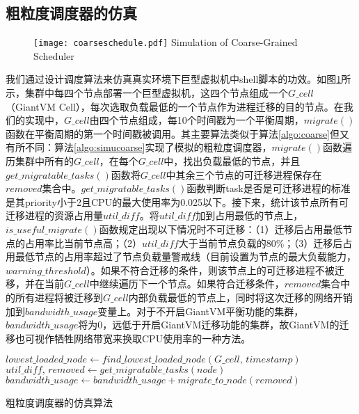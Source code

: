 \subsection{粗粒度调度器的仿真}
\begin{figure}[!htp]
  \centering
  \texttt{[image: coarseschedule.pdf]}
    {Simulation of Coarse-Grained Scheduler}
  \label{fig:simucoarse}
\end{figure}
我们通过设计调度算法来仿真真实环境下巨型虚拟机中shell脚本的功效。如图\ref{fig:simucoarse}所示，集群中每四个节点部署一个巨型虚拟机，这四个节点组成一个$G\_cell$（GiantVM Cell），每次选取负载最低的一个节点作为进程迁移的目的节点。在我们的实现中，$G\_cell$由四个节点组成，每10个时间戳为一个平衡周期，$migrate()$函数在平衡周期的第一个时间戳被调用。其主要算法类似于算法\ref{algo:coarse}但又有所不同：算法\ref{algo:simucoarse}实现了模拟的粗粒度调度器，$migrate()$函数遍历集群中所有的$G\_cell$，在每个$G\_cell$中，找出负载最低的节点，并且$get\_migratable\_tasks()$函数将$G\_cell$中其余三个节点的可迁移进程保存在$removed$集合中。$get\_migratable\_tasks()$函数判断task是否是可迁移进程的标准是其priority小于2且CPU的最大使用率为0.025以下。接下来，统计该节点所有可迁移进程的资源占用量$util\_diff$。将$util\_diff$加到占用最低的节点上，$is\_useful\_migrate()$函数规定出现以下情况时不可迁移：（1）迁移后占用最低节点的占用率比当前节点高；（2）$util\_diff$大于当前节点负载的80\%；（3）迁移后占用最低节点的占用率超过了节点负载量警戒线（目前设置为节点的最大负载能力，$warning\_threshold$）。如果不符合迁移的条件，则该节点上的可迁移进程不被迁移，并在当前$G\_cell$中继续遍历下一个节点。如果符合迁移条件，$removed$集合中的所有进程将被迁移到$G\_cell$内部负载最低的节点上，同时将这次迁移的网络开销加到$bandwidth\_usage$变量上。对于不开启GiantVM平衡功能的集群，$bandwidth\_usage$将为0，远低于开启GiantVM迁移功能的集群，故GiantVM的迁移也可视作牺牲网络带宽来换取CPU使用率的一种方法。

\begin{algorithm}[h]
\begin{algorithmic}[1]
\State $lowest\_loaded\_node \gets find\_lowest\_loaded\_node(G\_cell,\, timestamp)$
\State $util\_diff,\, removed \gets get\_migratable\_tasks(node)$
\State $bandwidth\_usage \gets bandwidth\_usage + migrate\_to\_node(removed)$
\EndIf
\EndFor
\EndFor
\end{algorithmic}
\caption{粗粒度调度器的仿真算法}
\label{algo:simucoarse}
\end{algorithm}


